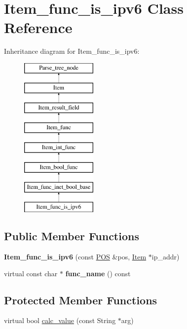 \hypertarget{classItem__func__is__ipv6}{}\section{Item\+\_\+func\+\_\+is\+\_\+ipv6 Class Reference}
\label{classItem__func__is__ipv6}
Inheritance diagram for Item\+\_\+func\+\_\+is\+\_\+ipv6\+:\begin{figure}[H]
\begin{center}
\leavevmode
\includegraphics[height=8.000000cm]{classItem__func__is__ipv6}
\end{center}
\end{figure}
\subsection*{Public Member Functions}
\begin{DoxyCompactItemize}
\item 
\mbox{\label{classItem__func__is__ipv6_a994acd4647fbe955642c380bd52dcab6}} 
{\bfseries Item\+\_\+func\+\_\+is\+\_\+ipv6} (const \mbox{\hyperlink{structYYLTYPE}{P\+OS}} \&pos, \mbox{\hyperlink{classItem}{Item}} $\ast$ip\+\_\+addr)
\item 
\mbox{\label{classItem__func__is__ipv6_a09e780f133c204419c8135606b1b62bd}} 
virtual const char $\ast$ {\bfseries func\+\_\+name} () const
\end{DoxyCompactItemize}
\subsection*{Protected Member Functions}
\begin{DoxyCompactItemize}
\item 
virtual bool \mbox{\hyperlink{classItem__func__is__ipv6_a83736a55b2a88846ed1595c855969c22}{calc\+\_\+value}} (const String $\ast$arg)
\end{DoxyCompactItemize}
